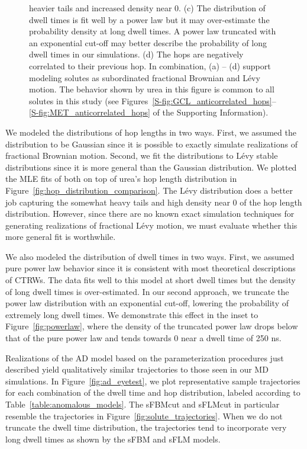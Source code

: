 \documentclass{article}
\begin{document}
\begin{figure}
{  heavier tails and increased density near 0. (c) The distribution of dwell times is fit
  well by a power law but it may over-estimate the probability density at long dwell times.
  A power law truncated with an exponential cut-off may better describe the probability of
  long dwell times in our simulations. (d) The hops are negatively correlated to their previous
  hop. In combination, (a) -- (d) support modeling solutes as subordinated fractional Brownian
  and L\'evy motion. The behavior shown by urea in this figure is common to all solutes in this study (see
  Figures~\ref{S-fig:GCL_anticorrelated_hops}--\ref{S-fig:MET_anticorrelated_hops} of the
  Supporting Information).}\label{fig:anticorrelated_hops}
  \end{figure}
  
  We modeled the distributions of hop lengths in two ways. First, we assumed the 
  distribution to be Gaussian since it is possible to exactly simulate realizations of
  fractional Brownian motion. Second, we fit the distributions to L\'evy stable 
  distributions since it is more general than the Gaussian distribution. We plotted
  the MLE fits of both on top of urea's hop length distribution in 
  Figure~\ref{fig:hop_distribution_comparison}. The L\'evy distribution does a better
  job capturing the somewhat heavy tails and high density near 0 of the hop length distribution.
  However, since there are no known exact simulation techniques for generating 
  realizations of fractional L\'evy motion, we must evaluate whether this more general
  fit is worthwhile. 
  
  We also modeled the distribution of dwell times in two ways. First, we assumed pure
  power law behavior since it is consistent with most theoretical descriptions of CTRWs.
  The data fits well to this model at short dwell times but the density of long dwell
  times is over-estimated. In our second approach, we truncate the power law distribution
  with an exponential cut-off, lowering the probability of extremely long dwell times. 
  We demonstrate this effect in the inset to Figure~\ref{fig:powerlaw}, where the
  density of the truncated power law drops below that of the pure power law and tends towards
  0 near a dwell time of 250 ns.
  
  Realizations of the AD model based on the parameterization procedures just described
  yield qualitatively similar trajectories to those seen in our MD simulations. In
  Figure~\ref{fig:ad_eyetest}, we plot representative sample trajectories for each
  combination of the dwell time and hop distribution, labeled according to Table~\ref{table:anomalous_models}.
  The sFBMcut and sFLMcut in particular resemble the trajectories in Figure~\ref{fig:solute_trajectories}.
  When we do not truncate the dwell time distribution, the trajectories tend to 
  incorporate very long dwell times as shown by the sFBM and sFLM models.
  
\end{document}
